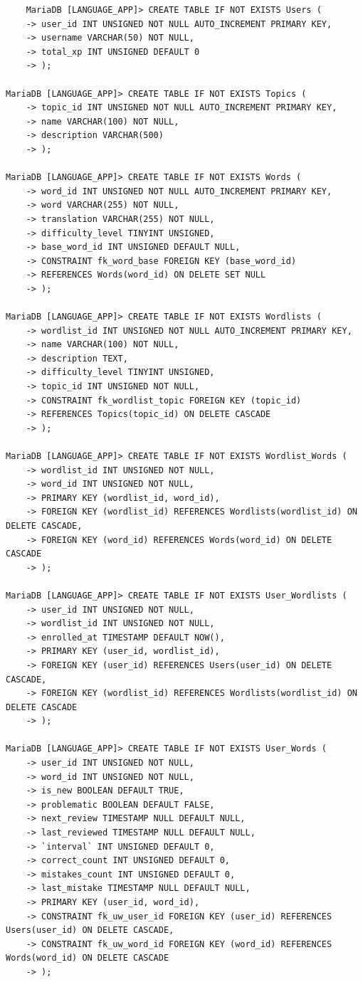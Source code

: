 \documentclass[a4paper, 11pt]{article}
\begin{document}
\begin{verbatim}
    MariaDB [LANGUAGE_APP]> CREATE TABLE IF NOT EXISTS Users (
    -> user_id INT UNSIGNED NOT NULL AUTO_INCREMENT PRIMARY KEY,
    -> username VARCHAR(50) NOT NULL,
    -> total_xp INT UNSIGNED DEFAULT 0
    -> );

MariaDB [LANGUAGE_APP]> CREATE TABLE IF NOT EXISTS Topics (
    -> topic_id INT UNSIGNED NOT NULL AUTO_INCREMENT PRIMARY KEY,
    -> name VARCHAR(100) NOT NULL,
    -> description VARCHAR(500)
    -> );

MariaDB [LANGUAGE_APP]> CREATE TABLE IF NOT EXISTS Words (
    -> word_id INT UNSIGNED NOT NULL AUTO_INCREMENT PRIMARY KEY,
    -> word VARCHAR(255) NOT NULL,
    -> translation VARCHAR(255) NOT NULL,
    -> difficulty_level TINYINT UNSIGNED,
    -> base_word_id INT UNSIGNED DEFAULT NULL,
    -> CONSTRAINT fk_word_base FOREIGN KEY (base_word_id)
    -> REFERENCES Words(word_id) ON DELETE SET NULL
    -> );

MariaDB [LANGUAGE_APP]> CREATE TABLE IF NOT EXISTS Wordlists (
    -> wordlist_id INT UNSIGNED NOT NULL AUTO_INCREMENT PRIMARY KEY,
    -> name VARCHAR(100) NOT NULL,
    -> description TEXT,
    -> difficulty_level TINYINT UNSIGNED,
    -> topic_id INT UNSIGNED NOT NULL,
    -> CONSTRAINT fk_wordlist_topic FOREIGN KEY (topic_id)
    -> REFERENCES Topics(topic_id) ON DELETE CASCADE
    -> );

MariaDB [LANGUAGE_APP]> CREATE TABLE IF NOT EXISTS Wordlist_Words (
    -> wordlist_id INT UNSIGNED NOT NULL,
    -> word_id INT UNSIGNED NOT NULL,
    -> PRIMARY KEY (wordlist_id, word_id),
    -> FOREIGN KEY (wordlist_id) REFERENCES Wordlists(wordlist_id) ON DELETE CASCADE,
    -> FOREIGN KEY (word_id) REFERENCES Words(word_id) ON DELETE CASCADE
    -> );

MariaDB [LANGUAGE_APP]> CREATE TABLE IF NOT EXISTS User_Wordlists (
    -> user_id INT UNSIGNED NOT NULL,
    -> wordlist_id INT UNSIGNED NOT NULL,
    -> enrolled_at TIMESTAMP DEFAULT NOW(),
    -> PRIMARY KEY (user_id, wordlist_id),
    -> FOREIGN KEY (user_id) REFERENCES Users(user_id) ON DELETE CASCADE,
    -> FOREIGN KEY (wordlist_id) REFERENCES Wordlists(wordlist_id) ON DELETE CASCADE
    -> );

MariaDB [LANGUAGE_APP]> CREATE TABLE IF NOT EXISTS User_Words (
    -> user_id INT UNSIGNED NOT NULL,
    -> word_id INT UNSIGNED NOT NULL,
    -> is_new BOOLEAN DEFAULT TRUE,
    -> problematic BOOLEAN DEFAULT FALSE,
    -> next_review TIMESTAMP NULL DEFAULT NULL,
    -> last_reviewed TIMESTAMP NULL DEFAULT NULL,
    -> `interval` INT UNSIGNED DEFAULT 0,
    -> correct_count INT UNSIGNED DEFAULT 0,
    -> mistakes_count INT UNSIGNED DEFAULT 0,
    -> last_mistake TIMESTAMP NULL DEFAULT NULL,
    -> PRIMARY KEY (user_id, word_id),
    -> CONSTRAINT fk_uw_user_id FOREIGN KEY (user_id) REFERENCES Users(user_id) ON DELETE CASCADE,
    -> CONSTRAINT fk_uw_word_id FOREIGN KEY (word_id) REFERENCES Words(word_id) ON DELETE CASCADE
    -> );
\end{verbatim}
\end{document}
